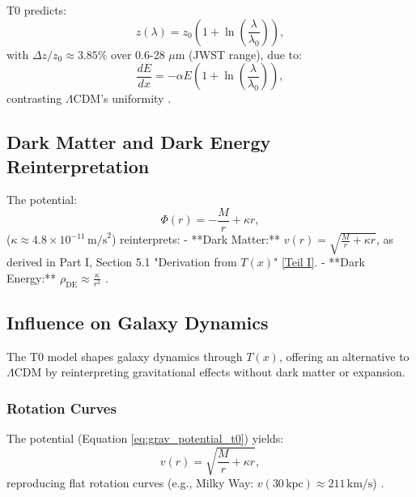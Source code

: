 \documentclass[12pt,a4paper]{article}
\newcommand{\Tfield}{T(x)}
\begin{document}
	T0 predicts:
	\begin{equation}
		z(\lambda) = z_0 \left(1 + \ln\left(\frac{\lambda}{\lambda_0}\right)\right),
		\label{eq:wavelength_redshift}
	\end{equation}
	with \(\Delta z / z_0 \approx 3.85\%\) over 0.6-28 \(\mu\text{m}\) (JWST range), due to:
	\begin{equation}
		\frac{dE}{dx} = -\alpha E \left(1 + \ln\left(\frac{\lambda}{\lambda_0}\right)\right),
		\label{eq:wavelength_energy_loss}
	\end{equation}
	contrasting \(\Lambda\)CDM’s uniformity \cite{pascher_params_2025}.
	
	\subsection{Dark Matter and Dark Energy Reinterpretation}
	\label{subsec:dark_reinterpretation}
	
	The potential:
	\begin{equation}
		\Phi(r) = -\frac{M}{r} + \kappa r,
		\label{eq:grav_potential_t0}
	\end{equation}
	(\(\kappa \approx 4.8 \times 10^{-11} \, \text{m/s}^2\)) reinterprets:
	- **Dark Matter:** \(v(r) = \sqrt{\frac{M}{r} + \kappa r}\), as derived in Part I, Section 5.1 "Derivation from \(\Tfield\)" \href{https://github.com/jpascher/T0-Time-Mass-Duality/tree/main/2/pdf/English/Bridging Quantum Mechanics and Relativity through Time-Mass Duality Part I Theoretical Foundations_en.pdf}{[Teil I]}.
	- **Dark Energy:** \(\rho_{\text{DE}} \approx \frac{\kappa}{r^2}\) \cite{pascher_galaxies_2025}.
	
	\subsection{Influence on Galaxy Dynamics}
	\label{subsec:galaxy_dynamics}
	
	The T0 model shapes galaxy dynamics through \(\Tfield\), offering an alternative to \(\Lambda\)CDM by reinterpreting gravitational effects without dark matter or expansion.
	
	\subsubsection{Rotation Curves}
	The potential (Equation \ref{eq:grav_potential_t0}) yields:
	\begin{equation}
		v(r) = \sqrt{\frac{M}{r} + \kappa r},
		\label{eq:rotation_velocity}
	\end{equation}
	reproducing flat rotation curves (e.g., Milky Way: \(v(30 \, \text{kpc}) \approx 211 \, \text{km/s}\)) \cite{pascher_galaxies_2025}.
	
\end{document}
